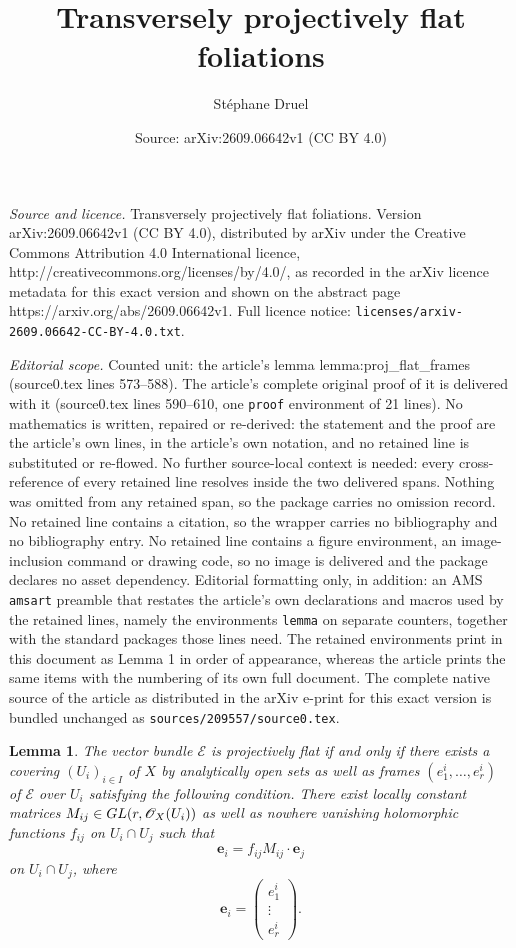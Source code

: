 \documentclass[10pt,a4paper]{amsart}
\title{Transversely projectively flat foliations}
\author{St\'ephane Druel}
\date{Source: arXiv:2609.06642v1 (CC BY 4.0)}
\newtheorem{lemma}{Lemma}
\newcommand{\sE}{\mathscr{E}}
\newcommand{\sO}{\mathscr{O}}
\begin{document}
\maketitle

\noindent\emph{Source and licence.} Transversely projectively flat foliations. Version arXiv:2609.06642v1 (CC BY 4.0), distributed by arXiv under the Creative Commons Attribution 4.0 International licence, http://creativecommons.org/licenses/by/4.0/, as recorded in the arXiv licence metadata for this exact version and shown on the abstract page https://arxiv.org/abs/2609.06642v1. Full licence notice: \texttt{licenses/arxiv-2609.06642-CC-BY-4.0.txt}.\par\smallskip

\noindent\textit{Editorial scope.} Counted unit: the article's lemma lemma:proj\_flat\_frames (source0.tex lines 573--588). The article's complete original proof of it is delivered with it (source0.tex lines 590--610, one \texttt{proof} environment of 21 lines). No mathematics is written, repaired or re-derived: the statement and the proof are the article's own lines, in the article's own notation, and no retained line is substituted or re-flowed.  No further source-local context is needed: every cross-reference of every retained line resolves inside the two delivered spans.  Nothing was omitted from any retained span, so the package carries no omission record.  No retained line contains a citation, so the wrapper carries no bibliography and no bibliography entry.  No retained line contains a figure environment, an image-inclusion command or drawing code, so no image is delivered and the package declares no asset dependency.  Editorial formatting only, in addition: an AMS \texttt{amsart} preamble that restates the article's own declarations and macros used by the retained lines, namely the environments \texttt{lemma} on separate counters, together with the standard packages those lines need.  The retained environments print in this document as Lemma 1 in order of appearance, whereas the article prints the same items with the numbering of its own full document.  The complete native source of the article as distributed in the arXiv e-print for this exact version is bundled unchanged as \texttt{sources/209557/source0.tex}.
\begin{lemma}\label{lemma:proj_flat_frames}
The vector bundle $\sE$ is projectively flat if and only if there exists a covering $(U_i)_{i \in I}$ of $X$ by analytically open sets as well as frames $(e_1^i,\ldots,e_r^i)$ of $\sE$ over $U_i$ satisfying the following condition. There exist locally constant matrices $M_{ij} \in \textup{GL}(r,\sO_X(U_i))$ as well as nowhere vanishing holomorphic functions $f_{ij}$ on $U_i\cap U_j$ such that 
\[
\textbf{e}_i= f_{ij} M_{ij} \cdot \textbf{e}_j
\]
on $U_i \cap U_j$, where 
\[
\textbf{e}_i = 
\begin{pmatrix}
e_1^i \\
\vdots \\
e_r^i
\end{pmatrix}
.
\]
\end{lemma}
\end{document}
